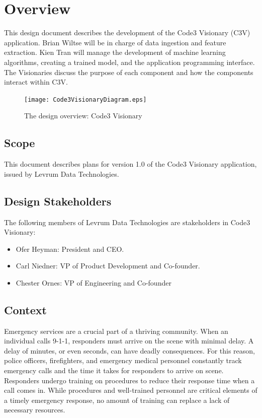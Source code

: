 \documentclass[onecolumn, draftclsnofoot,10pt, compsoc]{IEEEtran}
\begin{document}
\section{Overview}
\begin{singlespace}
This design document describes the development of the Code3 Visionary (C3V) application. 
Brian Wiltse will be in charge of data ingestion and feature extraction. 
Kien Tran will manage the development of machine learning algorithms, creating a trained model, and the application programming interface. 
The Visionaries discuss the purpose of each component and how the components interact within C3V.
\begin{figure}[h!]
    \centering
    \texttt{[image: Code3VisionaryDiagram.eps]}
    \caption{The design overview: Code3 Visionary}
    \label{fig:diagram}
\end{figure}
\subsection{Scope}
    This document describes plans for version 1.0 of the Code3 Visionary application, issued by Levrum Data Technologies.

    \subsection{Design Stakeholders}
        The following members of Levrum Data Technologies are stakeholders in Code3 Visionary:
        \begin{itemize}
            \item Ofer Heyman: President and CEO.
            \item Carl Niedner: VP of Product Development and Co-founder.
            \item Chester Ornes: VP of Engineering and Co-founder
        \end{itemize}

    \subsection{Context}
    Emergency services are a crucial part of a thriving community. When an individual calls 9-1-1, responders must arrive on the scene with minimal delay. A delay of minutes, or even seconds, can have deadly consequences. For this reason, police officers, firefighters, and emergency medical personnel constantly track emergency calls and the time it takes for responders to arrive on scene. Responders undergo training on procedures to reduce their response time when a call comes in. While procedures and well-trained personnel are critical elements of a timely emergency response, no amount of training can replace a lack of necessary resources.  
    

\end{singlespace}
\end{document}
